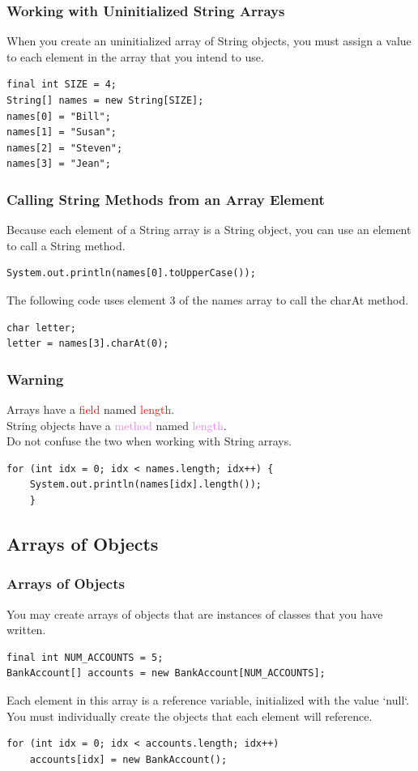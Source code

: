 \documentclass[11pt]{beamer}
\newcommand{\red}[1]{\textcolor{red}{#1}}
\newcommand{\violet}[1]{\textcolor{violet}{#1}}
\begin{document}
\begin{frame}[fragile]
    \frametitle{Working with Uninitialized String Arrays}
    When you create an uninitialized array of String objects, you must assign a value to each element in the array that you intend to use.
    \begin{lstlisting}
final int SIZE = 4;
String[] names = new String[SIZE];
names[0] = "Bill";
names[1] = "Susan";
names[2] = "Steven";
names[3] = "Jean";
    \end{lstlisting}
\end{frame}

\begin{frame}[fragile]
    \frametitle{Calling String Methods from an Array Element}
    Because each element of a String array is a String object, you can use an element to call a String method.
    \begin{lstlisting}
System.out.println(names[0].toUpperCase());
    \end{lstlisting}
    The following code uses element 3 of the names array to call the charAt method.
    \begin{lstlisting}
char letter;
letter = names[3].charAt(0);
    \end{lstlisting}
\end{frame}

\begin{frame}[fragile]
    \frametitle{Warning}
    Arrays have a \red{field} named \red{length}. \\ \vspace{1em}
    String objects have a \violet{method} named \violet{length}. \\ \vspace{1em}
    Do not confuse the two when working with String arrays.
    \begin{lstlisting}
for (int idx = 0; idx < names.length; idx++) {
    System.out.println(names[idx].length());
    }
    \end{lstlisting}
\end{frame}

\subsection{Arrays of Objects}
\begin{frame}[fragile]
    \frametitle{Arrays of Objects}
    You may create arrays of objects that are instances of classes that you have written.
    \begin{lstlisting}
final int NUM_ACCOUNTS = 5;
BankAccount[] accounts = new BankAccount[NUM_ACCOUNTS];
    \end{lstlisting}
    Each element in this array is a reference variable, initialized with the value `null`. You must individually create the objects that each element will reference.
    \begin{lstlisting}
for (int idx = 0; idx < accounts.length; idx++)
    accounts[idx] = new BankAccount();
    \end{lstlisting}
\end{frame}
\end{document}
